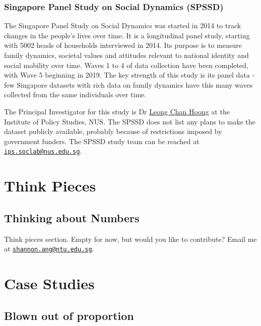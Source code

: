 \documentclass[openany]{book}
\begin{document}
\section{Singapore Panel Study on Social Dynamics
(SPSSD)}\label{singapore-panel-study-on-social-dynamics-spssd}

The Singapore Panel Study on Social Dynamics was started in 2014 to
track changes in the people's lives over time. It is a longitudinal
panel study, starting with 5002 heads of households interviewed in 2014.
Its purpose is to measure family dynamics, societal values and attitudes
relevant to national identity and social mobility over time. Waves 1 to
4 of data collection have been completed, with Wave 5 beginning in 2019.
The key strength of this study is its panel data - few Singapore
datasets with rich data on family dynamics have this many waves
collected from the same individuals over time.

The Principal Investigator for this study is Dr
\href{http://lkyspp.nus.edu.sg/our-people/faculty/leong-chan-hoong}{Leong
Chan Hoong} at the Institute of Policy Studies, NUS. The SPSSD does not
list any plans to make the dataset publicly available, probably because
of restrictions imposed by government funders. The SPSSD study team can
be reached at
\href{mailto:ips.soclab@nus.edu.sg}{\nolinkurl{ips.soclab@nus.edu.sg}}.

\part{Think Pieces}\label{part-think-pieces}

\chapter{Thinking about Numbers}\label{think}

Think pieces section. Empty for now, but would you like to contribute?
Email me at
\href{mailto:shannon.ang@ntu.edu.sg}{\nolinkurl{shannon.ang@ntu.edu.sg}}.

\part{Case Studies}\label{part-case-studies}

\chapter{Blown out of proportion}\label{oop}
\end{document}
